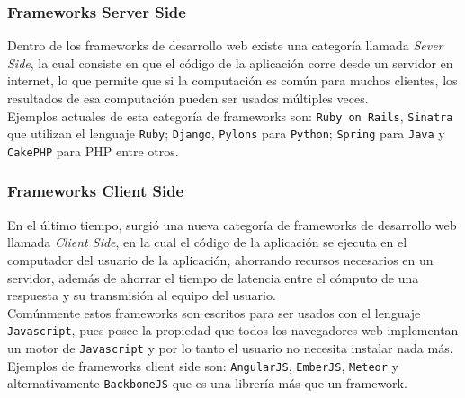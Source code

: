 \subsubsection{Frameworks Server Side} %
\label{ssub:frameworks_server_side}
Dentro de los frameworks de desarrollo web existe una categoría llamada \emph{Sever Side}, la cual consiste en que el código de la aplicación corre desde un servidor en internet, lo que permite que si la computación es común para muchos clientes, los resultados de esa computación pueden ser usados múltiples veces.\\

Ejemplos actuales de esta categoría de frameworks son: \texttt{Ruby on Rails}\cite{rails}, \texttt{Sinatra}\cite{sinatra} que utilizan el lenguaje \texttt{Ruby}; \texttt{Django}\cite{django}, \texttt{Pylons}\cite{pylons} para \texttt{Python}; \texttt{Spring}\cite{spring} para \texttt{Java} y \texttt{CakePHP}\cite{cake} para PHP entre otros.

\subsubsection{Frameworks Client Side} %
\label{ssub:frameworks_client_side}
En el último tiempo, surgió una nueva categoría de frameworks de desarrollo web llamada \emph{Client Side}, en la cual el código de la aplicación se ejecuta en el computador del usuario de la aplicación, ahorrando recursos necesarios en un servidor, además de ahorrar el tiempo de latencia entre el cómputo de una respuesta y su transmisión al equipo del usuario.\\

Comúnmente estos frameworks son escritos para ser usados con el lenguaje \texttt{Javascript}, pues posee la propiedad que todos los navegadores web implementan un motor de \texttt{Javascript} y por lo tanto el usuario no necesita instalar nada más. Ejemplos de frameworks client side son: \texttt{AngularJS}\cite{angular}, \texttt{EmberJS}\cite{ember}, \texttt{Meteor}\cite{meteor} y alternativamente \texttt{BackboneJS}\cite{backbone} que es una librería más que un framework.



